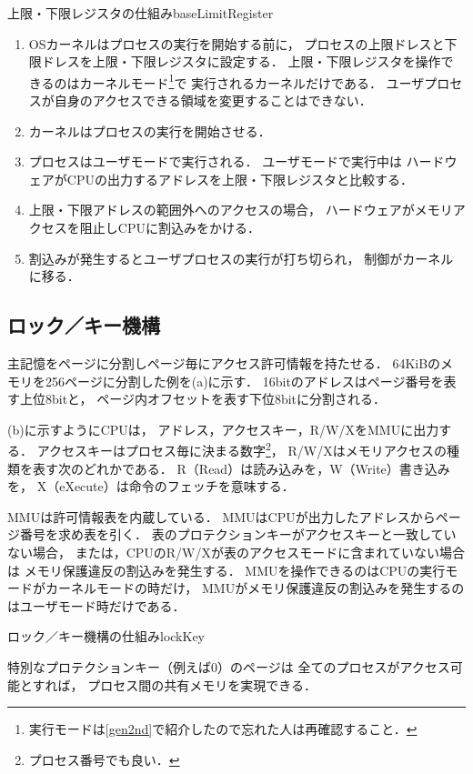 {上限・下限レジスタの仕組み}{baseLimitRegister}

\begin{enumerate}
\item OSカーネルはプロセスの実行を開始する前に，
プロセスの上限ドレスと下限ドレスを上限・下限レジスタに設定する．
上限・下限レジスタを操作できるのはカーネルモード\footnote{
実行モードは\ref{gen2nd}で紹介したので忘れた人は再確認すること．}で
実行されるカーネルだけである．
ユーザプロセスが自身のアクセスできる領域を変更することはできない．
\item カーネルはプロセスの実行を開始させる．
\item プロセスはユーザモードで実行される．
ユーザモードで実行中は
ハードウェアがCPUの出力するアドレスを上限・下限レジスタと比較する．
\item 上限・下限アドレスの範囲外へのアクセスの場合，
ハードウェアがメモリアクセスを阻止しCPUに割込みをかける．
\item 割込みが発生するとユーザプロセスの実行が打ち切られ，
制御がカーネルに移る．
\end{enumerate}

\subsection{ロック／キー機構}
主記憶をページに分割しページ毎にアクセス許可情報を持たせる．
64KiBのメモリを256ページに分割した例を(a)に示す．
16bitのアドレスはページ番号を表す上位8bitと，
ページ内オフセットを表す下位8bitに分割される．

(b)に示すようにCPUは，
アドレス，アクセスキー，R/W/XをMMUに出力する．
アクセスキーはプロセス毎に決まる数字\footnote{プロセス番号でも良い．}，
R/W/Xはメモリアクセスの種類を表す次のどれかである．
R（Read）は読み込みを，W（Write）書き込みを，
X（eXecute）は命令のフェッチを意味する．

MMUは許可情報表を内蔵している．
MMUはCPUが出力したアドレスからページ番号を求め表を引く．
表のプロテクションキーがアクセスキーと一致していない場合，
または，CPUのR/W/Xが表のアクセスモードに含まれていない場合は
メモリ保護違反の割込みを発生する．
MMUを操作できるのはCPUの実行モードがカーネルモードの時だけ，
MMUがメモリ保護違反の割込みを発生するのはユーザモード時だけである．

{ロック／キー機構の仕組み}{lockKey}

特別なプロテクションキー（例えば0）のページは
全てのプロセスがアクセス可能とすれば，
プロセス間の共有メモリを実現できる．

